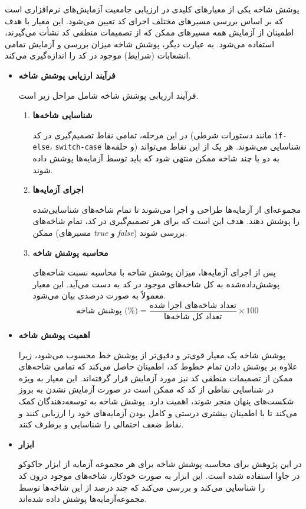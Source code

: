پوشش شاخه  یکی از معیارهای کلیدی در ارزیابی جامعیت آزمایش‌های نرم‌افزاری است که بر اساس بررسی مسیرهای مختلف اجرای کد تعیین می‌شود. این معیار با هدف اطمینان از آزمایش همه مسیرهای ممکن که از تصمیمات منطقی کد نشأت می‌گیرند، استفاده می‌شود. به عبارت دیگر، پوشش شاخه میزان بررسی و آزمایش تمامی انشعابات (شرایط) موجود در کد را اندازه‌گیری می‌کند.
\begin{itemize}
	
	\item \textbf{فرآیند ارزیابی پوشش شاخه}

فرآیند ارزیابی پوشش شاخه شامل مراحل زیر است.

\begin{enumerate}
	\item \textbf{شناسایی شاخه‌ها}
	
	 در این مرحله، تمامی نقاط تصمیم‌گیری در کد (مانند دستورات شرطی \texttt{if-else}، \texttt{switch-case} و حلقه‌ها) شناسایی می‌شوند. هر یک از این نقاط می‌تواند به دو یا چند شاخه ممکن منتهی شود که باید توسط آزمایه‌ها پوشش داده شوند.
	\item \textbf{اجرای آزمایه‌ها}
	
	 مجموعه‌ای از آزمایه‌ها طراحی و اجرا می‌شوند تا تمام شاخه‌های شناسایی‌شده را پوشش دهند. هدف این است که برای هر تصمیم‌گیری در کد، تمام شاخه‌های ممکن (مسیرهای \textit{true} و \textit{false}) بررسی شوند.
	\item \textbf{محاسبه پوشش شاخه}
	
	 پس از اجرای آزمایه‌ها، میزان پوشش شاخه با محاسبه نسبت شاخه‌های پوشش‌داده‌شده به کل شاخه‌های موجود در کد به دست می‌آید. این معیار معمولاً به صورت درصدی بیان می‌شود.
	\[
	\text{پوشش شاخه (\%)} = \frac{\text{تعداد شاخه‌های اجرا شده}}{\text{تعداد کل شاخه‌ها}} \times 100
	\]
\end{enumerate}

\item \textbf{اهمیت پوشش شاخه}

پوشش شاخه یک معیار قوی‌تر و دقیق‌تر از پوشش خط محسوب می‌شود\cite{yang2006survey}، زیرا علاوه بر پوشش دادن تمام خطوط کد، اطمینان حاصل می‌کند که تمامی شاخه‌های ممکن از تصمیمات منطقی کد نیز مورد آزمایش قرار گرفته‌اند. این معیار به ویژه در شناسایی نقاطی از کد که ممکن است در صورت آزمایش نشدن به بروز شکست‌های پنهان منجر شوند، اهمیت دارد. پوشش شاخه به توسعه‌دهندگان کمک می‌کند تا با اطمینان بیشتری درستی و کامل بودن آزمایه‌های خود را ارزیابی کنند و نقاط ضعف احتمالی را شناسایی و برطرف کنند.

\item \textbf{ابزار}

در این پژوهش برای محاسبه پوشش شاخه برای هر مجموعه آزمایه از ابزار جاکوکو
در جاوا استفاده شده است. این ابزار به صورت خودکار، شاخه‌های موجود درون کد را شناسایی می‌کند و بررسی می‌کند که چند درصد از این شاخه‌ها توسط مجموعه‌آزمایه‌ها پوشش داده شده‌اند.
\end{itemize}

